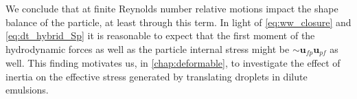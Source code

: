 We conclude that at finite Reynolds number relative motions impact the shape balance of the particle, at least through this term. 
In light of \ref{eq:ww_closure} and \ref{eq:dt_hybrid_Sp} it is reasonable to expect that the first moment of the hydrodynamic forces as well as the particle internal stress might be $\sim \textbf{u}_{fp}\textbf{u}_{pf} $ as well. 
This finding motivates us, in \ref{chap:deformable}, to investigate the effect of inertia on the effective stress generated by translating droplets in dilute emulsions.




 
